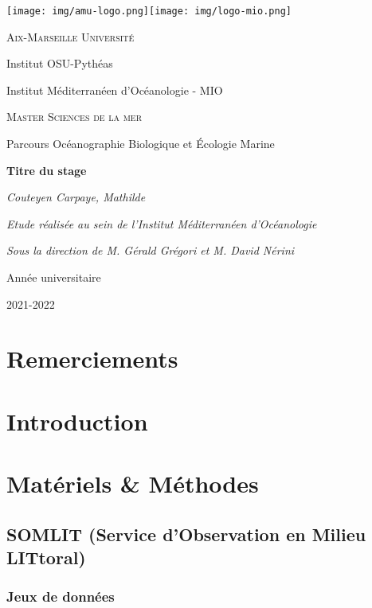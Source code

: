 \documentclass[12pt]{article}
\newcommand\myemptypage{
    \null
    \thispagestyle{empty}
    \addtocounter{page}{-1}
    \newpage
    }
\begin{document}
\begin{titlepage}
\centering
\texttt{[image: img/amu-logo.png]}\hfill  \texttt{[image: img/logo-mio.png]}\par\vspace{1cm}
{\scshape\large Aix-Marseille Université\par}
{\large Institut OSU-Pythéas\par}
Institut Méditerranéen d’Océanologie - MIO \par
\vspace{2cm}
{\scshape\large Master Sciences de la mer\par}
{\large Parcours Océanographie Biologique et Écologie Marine\par}
\vspace{2cm}
{\LARGE \bfseries Titre du stage\par}
\vspace{.5cm}
{\large \itshape Couteyen Carpaye, Mathilde\par}
\vfill
{\itshape Etude réalisée au sein de l'Institut Méditerranéen d'Océanologie\par}
{\itshape Sous la direction de M. Gérald Grégori et M. David Nérini\par }
\vfill
Année universitaire\par
2021-2022
\end{titlepage}

\myemptypage

\section*{Remerciements}


\newpage


\newpage
\tableofcontents
\newpage


\section{Introduction}


\section{Matériels \& Méthodes}

\subsection{SOMLIT (Service d'Observation en Milieu LITtoral)}

\subsubsection{Jeux de données}
\end{document}
